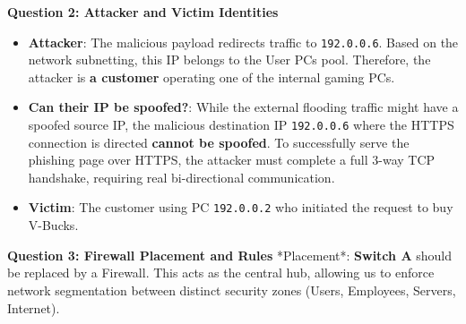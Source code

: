 \documentclass{article}
\begin{document}
\textbf{Question 2: Attacker and Victim Identities}
\begin{itemize}
    \item \textbf{Attacker}: The malicious payload redirects traffic to \texttt{192.0.0.6}. Based on the network subnetting, this IP belongs to the User PCs pool. Therefore, the attacker is \textbf{a customer} operating one of the internal gaming PCs.
    \item \textbf{Can their IP be spoofed?}: While the external flooding traffic might have a spoofed source IP, the malicious destination IP \texttt{192.0.0.6} where the HTTPS connection is directed \textbf{cannot be spoofed}. To successfully serve the phishing page over HTTPS, the attacker must complete a full 3-way TCP handshake, requiring real bi-directional communication.
    \item \textbf{Victim}: The customer using PC \texttt{192.0.0.2} who initiated the request to buy V-Bucks.

\end{itemize}
\textbf{Question 3: Firewall Placement and Rules}
*Placement*: \textbf{Switch A} should be replaced by a Firewall. This acts as the central hub, allowing us to enforce network segmentation between distinct security zones (Users, Employees, Servers, Internet).
\end{document}
